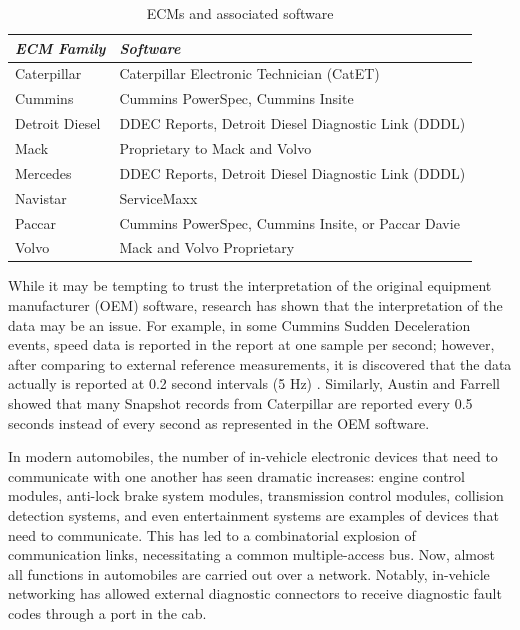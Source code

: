 \begin{table}
\centering
\begin{tabular}{|l|l|}
\hline
\emph{ECM Family} & \emph{Software}\\
\hline
Caterpillar & Caterpillar Electronic Technician (CatET)\\
\hline
Cummins & Cummins PowerSpec, Cummins Insite\\
\hline
Detroit Diesel & DDEC Reports, Detroit Diesel Diagnostic Link (DDDL)\\
\hline
Mack & Proprietary to Mack and Volvo\\
\hline
Mercedes & DDEC Reports, Detroit Diesel Diagnostic Link (DDDL)\\
\hline
Navistar & ServiceMaxx \\
\hline
Paccar & Cummins PowerSpec, Cummins Insite, or Paccar Davie\\
\hline
Volvo & Mack and Volvo Proprietary\\
\hline
\end{tabular}
\caption{ECMs and associated software}
\label{tab:software}
\end{table}
While it may be tempting to trust the interpretation of the original equipment manufacturer (OEM) software, research has shown 
that the interpretation of the data may be an issue. For example, in some Cummins Sudden Deceleration 
events, speed data is reported in the report at one sample per second; however, after comparing to 
external reference measurements, it is discovered that the data actually is reported at 0.2 second 
intervals (5 Hz) \cite{bortolin2009}. Similarly, Austin and Farrell \cite{austin2011} showed that many Snapshot records 
from Caterpillar are reported every 0.5 seconds instead of every second as represented in the OEM software.


In modern automobiles, the number of in-vehicle electronic devices that need to communicate with one another has seen dramatic increases:
engine control modules, anti-lock brake system modules, transmission control modules, collision detection systems, and even entertainment systems are examples of
devices that need to communicate. This has led to a combinatorial explosion of communication links, necessitating a common multiple-access
bus. Now, almost all functions in automobiles are carried out over a network. Notably, in-vehicle networking has allowed external diagnostic
connectors to receive diagnostic fault codes through a port in the cab.

